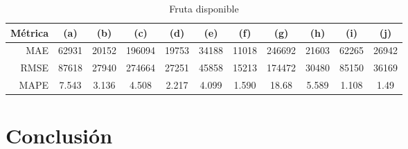 \documentclass[a4paper,10pt]{article}
\begin{document}
\begin{table}[t]
 \begin{center}
  \begin{tabular}{|r|c|c|c|c|c|c|c|c|c|c|}
    Métrica & (a) & (b) & (c) & (d) & (e) & (f) & (g) & (h) & (i) & (j) \\ \hline
    MAE & 62931 & 20152 & 196094 & 19753 & 34188 & 11018 & 246692 & 21603 & 62265 & 26942 \\
    RMSE & 87618 & 27940 & 274664 & 27251 & 45858 & 15213 & 174472 & 30480 & 85150 & 36169 \\
    MAPE & 7.543 & 3.136 & 4.508 & 2.217 & 4.099 & 1.590 & 18.68 & 5.589 & 1.108 & 1.49 \\ \hline
  \end{tabular}
  \caption{Fruta disponible}
  \label{tab:btc_prophet_m}
 \end{center}
\end{table}





\section{Conclusión}
\end{document}
